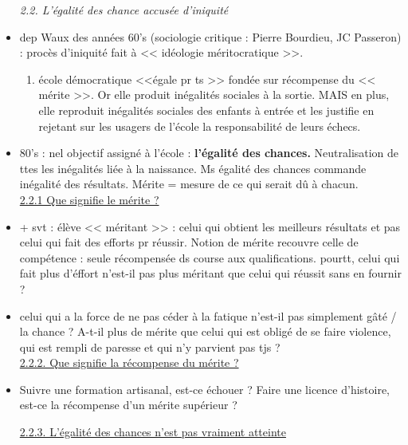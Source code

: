 \documentclass[12pt]{report}
\begin{document}
\begin{itemize}
\textit{2.2. L'égalité des chance accusée d'iniquité} \\

\item dep Waux des années 60's (sociologie critique : Pierre Bourdieu, JC Passeron) : procès d'iniquité fait à << idéologie méritocratique >>.
\begin{enumerate}
\item école démocratique <<égale pr ts >> fondée sur récompense du << mérite >>.  Or elle produit inégalités sociales à la sortie. MAIS en plus, elle reproduit inégalités sociales des enfants à entrée et les justifie en rejetant sur les usagers de l'école la responsabilité de leurs échecs.\\
\end{enumerate}

\item 80's : nel objectif assigné à l'école : \textbf{l'égalité des chances.} Neutralisation de ttes les inégalités liée à la naissance. Ms égalité des chances commande inégalité des résultats. Mérite = mesure de ce qui serait dû à chacun.\\

\underline{2.2.1 Que signifie le mérite ?} \\

\item + svt : élève << méritant >> : celui qui obtient les meilleurs résultats et pas celui qui fait des efforts pr réussir. Notion de mérite recouvre celle de compétence : seule récompensée ds course aux qualifications. pourtt, celui qui fait plus d'éffort n'est-il pas plus méritant que celui qui réussit sans en fournir ?\\

\item celui qui a la force de ne pas céder à la fatique n'est-il pas simplement gâté / la chance ? A-t-il plus de mérite que celui qui est obligé de se faire violence, qui est rempli de paresse et qui n'y parvient pas tjs ? \\

\underline{2.2.2. Que signifie la récompense du mérite ?} \\

\item Suivre une formation artisanal, est-ce échouer ? Faire une licence d'histoire, est-ce la récompense d'un mérite supérieur ? 

\underline{2.2.3. L'égalité des chances n'est pas vraiment atteinte}\\


\end{itemize}
\end{document}
